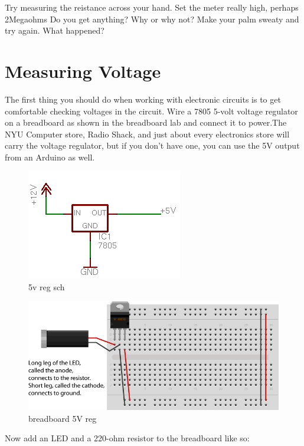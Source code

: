 Try measuring the reistance across your hand. Set the meter really high, perhaps 2Megaohms Do you get anything? Why or why not? Make your palm sweaty and try again. What happened?

\section{Measuring Voltage}

The first thing you should do when working with electronic circuits is to get comfortable checking voltages in the circuit. Wire a 7805 5-volt voltage regulator on a breadboard as shown in the breadboard lab and connect it to power.The NYU Computer store, Radio Shack, and just about every electronics store will carry the voltage regulator, but if you don't have one, you can use the 5V output from an Arduino as well.

\begin{figure}[!htb]
 \centering
 \includegraphics[scale=0.8]{img/electronics/5v_reg_sch.png}
 \caption{5v reg sch}
 \label{5v reg sch}
\end{figure}

\begin{figure}[!htb]
 \centering
 \includegraphics[scale=0.8]{img/electronics/breadboard_5V_reg.png}
 \caption{breadboard 5V reg}
 \label{breadboard 5V reg}
\end{figure}

Now add an LED and a 220-ohm resistor to the breadboard like so:

